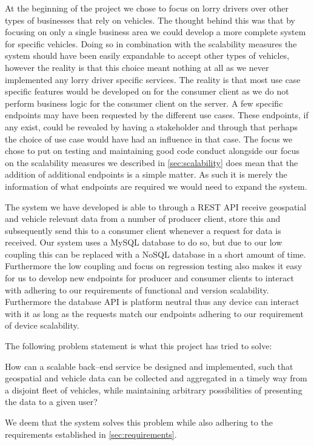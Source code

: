 At the beginning of the project we chose to focus on lorry drivers over other types of businesses that rely on vehicles.
The thought behind this was that by focusing on only a single business area we could develop a more complete system for specific vehicles.
Doing so in combination with the scalability measures the system should have been easily expandable to accept other types of vehicles, however the reality is that this choice meant nothing at all as we never implemented any lorry driver specific services.
The reality is that most use case specific features would be developed on for the consumer client as we do not perform business logic for the consumer client on the server.
A few specific endpoints may have been requested by the different use cases.
These endpoints, if any exist, could be revealed by having a stakeholder and through that perhaps the choice of use case would have had an influence in that case.
The focus we chose to put on testing and maintaining good code conduct alongside our focus on the scalability measures we described in \cref{sec:scalability} does mean that the addition of additional endpoints is a simple matter. 
As such it is merely the information of what endpoints are required we would need to expand the system.

\bigskip \noindent
The system we have developed is able to through a REST API receive geospatial and vehicle relevant data from a number of producer client, store this and subsequently send this to a consumer client whenever a request for data is received.
Our system uses a MySQL database to do so, but due to our low coupling this can be replaced with a NoSQL database in a short amount of time.
Furthermore the low coupling and focus on regression testing also makes it easy for us to develop new endpoints for producer and consumer clients to interact with adhering to our requirements of functional and version scalability.
Furthermore the database API is platform neutral thus any device can interact with it as long as the requests match our endpoints adhering to our requirement of device scalability.

The following problem statement is what this project has tried to solve:
\medskip
{\addtolength{\leftskip}{10mm}\addtolength{\rightskip}{10mm}\noindent\hrulefill\it

\noindent How can a scalable back--end service be designed and implemented,
such that geospatial and vehicle data can be collected and aggregated in a timely way from a disjoint fleet of vehicles,
while maintaining arbitrary possibilities of presenting the data to a given user?

\noindent\hrulefill

}
We deem that the system solves this problem while also adhering to the requirements established in \cref{sec:requirements}.

